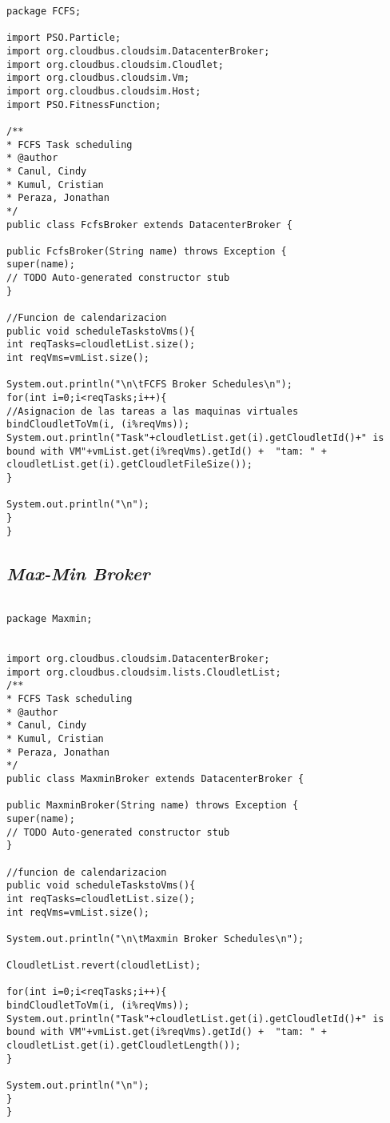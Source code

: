 \begin{lstlisting}
package FCFS;

import PSO.Particle;
import org.cloudbus.cloudsim.DatacenterBroker;
import org.cloudbus.cloudsim.Cloudlet;
import org.cloudbus.cloudsim.Vm;
import org.cloudbus.cloudsim.Host;
import PSO.FitnessFunction;

/**
* FCFS Task scheduling
* @author
* Canul, Cindy
* Kumul, Cristian
* Peraza, Jonathan
*/
public class FcfsBroker extends DatacenterBroker {

public FcfsBroker(String name) throws Exception {
super(name);
// TODO Auto-generated constructor stub
}

//Funcion de calendarizacion
public void scheduleTaskstoVms(){
int reqTasks=cloudletList.size();
int reqVms=vmList.size();

System.out.println("\n\tFCFS Broker Schedules\n");
for(int i=0;i<reqTasks;i++){
//Asignacion de las tareas a las maquinas virtuales
bindCloudletToVm(i, (i%reqVms));
System.out.println("Task"+cloudletList.get(i).getCloudletId()+" is bound with VM"+vmList.get(i%reqVms).getId() +  "tam: " + cloudletList.get(i).getCloudletFileSize());
}

System.out.println("\n");
}
}
\end{lstlisting}


\subsection*{\textit{Max-Min Broker}}
\begin{lstlisting}

package Maxmin;


import org.cloudbus.cloudsim.DatacenterBroker;
import org.cloudbus.cloudsim.lists.CloudletList;
/**
* FCFS Task scheduling
* @author
* Canul, Cindy
* Kumul, Cristian
* Peraza, Jonathan
*/
public class MaxminBroker extends DatacenterBroker {

public MaxminBroker(String name) throws Exception {
super(name);
// TODO Auto-generated constructor stub
}

//funcion de calendarizacion
public void scheduleTaskstoVms(){
int reqTasks=cloudletList.size();
int reqVms=vmList.size();

System.out.println("\n\tMaxmin Broker Schedules\n");

CloudletList.revert(cloudletList);

for(int i=0;i<reqTasks;i++){
bindCloudletToVm(i, (i%reqVms));
System.out.println("Task"+cloudletList.get(i).getCloudletId()+" is bound with VM"+vmList.get(i%reqVms).getId() +  "tam: " + cloudletList.get(i).getCloudletLength());
}

System.out.println("\n");
}
}

\end{lstlisting}



